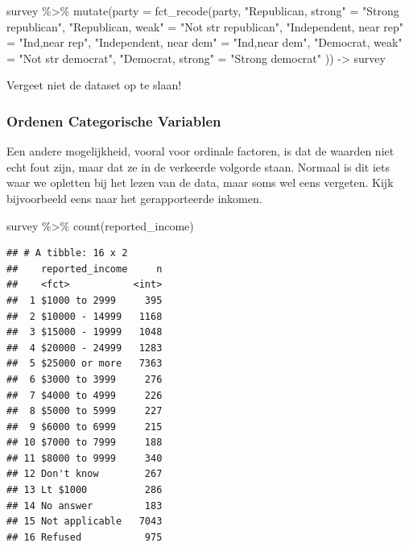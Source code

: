 \documentclass[]{tufte-book}
\newenvironment{Shaded}{}{}
\newcommand{\AttributeTok}[1]{\textcolor[rgb]{0.49,0.56,0.16}{#1}}
\newcommand{\FunctionTok}[1]{\textcolor[rgb]{0.02,0.16,0.49}{#1}}
\newcommand{\NormalTok}[1]{#1}
\newcommand{\OtherTok}[1]{\textcolor[rgb]{0.00,0.44,0.13}{#1}}
\newcommand{\SpecialCharTok}[1]{\textcolor[rgb]{0.25,0.44,0.63}{#1}}
\newcommand{\StringTok}[1]{\textcolor[rgb]{0.25,0.44,0.63}{#1}}
\begin{document}
\begin{Shaded}
\begin{Highlighting}[]
\NormalTok{survey }\SpecialCharTok{\%\textgreater{}\%}
  \FunctionTok{mutate}\NormalTok{(}\AttributeTok{party =} \FunctionTok{fct\_recode}\NormalTok{(party,}
    \StringTok{"Republican, strong"}    \OtherTok{=} \StringTok{"Strong republican"}\NormalTok{,}
    \StringTok{"Republican, weak"}      \OtherTok{=} \StringTok{"Not str republican"}\NormalTok{,}
    \StringTok{"Independent, near rep"} \OtherTok{=} \StringTok{"Ind,near rep"}\NormalTok{,}
    \StringTok{"Independent, near dem"} \OtherTok{=} \StringTok{"Ind,near dem"}\NormalTok{,}
    \StringTok{"Democrat, weak"}        \OtherTok{=} \StringTok{"Not str democrat"}\NormalTok{,}
    \StringTok{"Democrat, strong"}      \OtherTok{=} \StringTok{"Strong democrat"}
\NormalTok{  )) }\OtherTok{{-}\textgreater{}}\NormalTok{ survey}
\end{Highlighting}
\end{Shaded}

Vergeet niet de dataset op te slaan!

\hypertarget{ordenen-categorische-variablen}{%
\subsubsection{Ordenen Categorische Variablen}\label{ordenen-categorische-variablen}}

Een andere mogelijkheid, vooral voor ordinale factoren, is dat de waarden niet echt fout zijn, maar dat ze in de verkeerde volgorde staan. Normaal is dit iets waar we opletten bij het lezen van de data, maar soms wel eens vergeten. Kijk bijvoorbeeld eens naar het gerapporteerde inkomen.

\begin{Shaded}
\begin{Highlighting}[]
\NormalTok{survey }\SpecialCharTok{\%\textgreater{}\%}
  \FunctionTok{count}\NormalTok{(reported\_income)}
\end{Highlighting}
\end{Shaded}

\begin{verbatim}
## # A tibble: 16 x 2
##    reported_income     n
##    <fct>           <int>
##  1 $1000 to 2999     395
##  2 $10000 - 14999   1168
##  3 $15000 - 19999   1048
##  4 $20000 - 24999   1283
##  5 $25000 or more   7363
##  6 $3000 to 3999     276
##  7 $4000 to 4999     226
##  8 $5000 to 5999     227
##  9 $6000 to 6999     215
## 10 $7000 to 7999     188
## 11 $8000 to 9999     340
## 12 Don't know        267
## 13 Lt $1000          286
## 14 No answer         183
## 15 Not applicable   7043
## 16 Refused           975
\end{verbatim}
\end{document}
